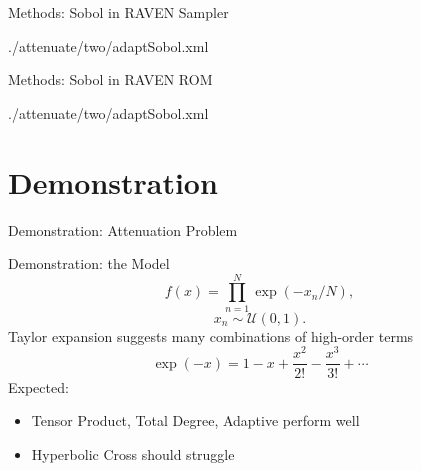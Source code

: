 \documentclass[t,9pt,svgnames]{beamer}
\begin{document}
\begin{frame}{Methods: Sobol in RAVEN}
  Sampler
  
          {./attenuate/two/adaptSobol.xml}
\end{frame}

\begin{frame}{Methods: Sobol in RAVEN}
  ROM
  
          {./attenuate/two/adaptSobol.xml}
\end{frame}
%
%
\section{Demonstration}
\begin{frame}{Demonstration: Attenuation Problem}
\end{frame}

\begin{frame}{Demonstration: the Model}
  \begin{equation}
    f(x) = \prod_{n=1}^N \exp(-x_n/N),
  \end{equation}
  \begin{equation}
    x_n \sim \mathcal{U}(0,1).
  \end{equation}
  Taylor expansion suggests many combinations of high-order terms
  \begin{equation}
    \exp(-x) = 1-x+\frac{x^2}{2!}-\frac{x^3}{3!}+\cdots
  \end{equation}
  Expected: 
  \begin{itemize}
    \item Tensor Product, Total Degree, Adaptive perform well
    \item Hyperbolic Cross should struggle
  \end{itemize}
\end{frame}
\end{document}
